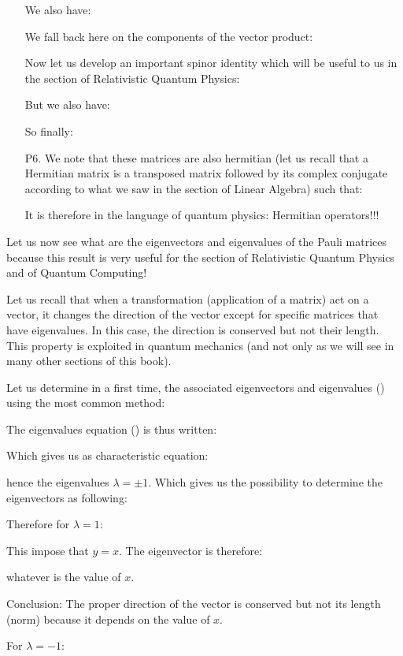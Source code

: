 \begin{enumerate}
		We also have:
		
		We fall back here on the components of the vector product:
		
		Now let us develop an important spinor identity which will be useful to us in the section of Relativistic Quantum Physics:
		
		But we also have:
		
		So finally:	
		
	
		\item[P6.] We note that these matrices are also hermitian (let us recall that a Hermitian matrix is a transposed matrix followed by its complex conjugate according to what we saw in the section of Linear Algebra) such that:
		
		It is therefore in the language of quantum physics: Hermitian operators!!!
	\end{enumerate}
	Let us now see what are the eigenvectors and eigenvalues of the Pauli matrices because this result is very useful for the section of Relativistic Quantum Physics and of Quantum Computing!

	Let us recall that when a transformation (application of a matrix) act on a vector, it changes the direction of the vector except for specific matrices that have eigenvalues. In this case, the direction is conserved but not their length. This property is exploited in quantum mechanics (and not only as we will see in many other sections of this book).
	
	Let us determine in a first time, the associated eigenvectors and eigenvalues () using the most common method:
	
	The eigenvalues equation () is thus written:
	
	Which gives us as characteristic equation:
	
	hence the eigenvalues $\lambda=\pm 1$. Which gives us the possibility to determine the eigenvectors as following:
	
	Therefore for $\lambda=1$:
	
	This impose that $y=x$. The eigenvector is therefore:
	
	whatever is the value of $x$.
	
	Conclusion: The proper direction of the vector is conserved but not its length (norm) because it depends on the value of $x$.
	
	For $\lambda=-1$:
	
